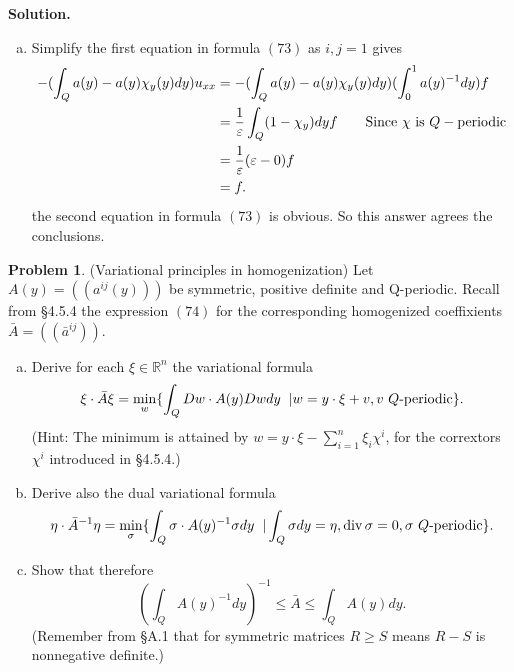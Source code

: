 \documentclass[a4paper]{book}
\newenvironment{solution}%
{\noindent\textbf{Solution.}}%
{\qedhere}
\numberwithin{equation}{chapter}
\theoremstyle{definition}
\newtheorem{pro}[exm]{Problem}
\begin{document}
\begin{solution}
  \begin{enumerate}[(b)]
  \item Simplify the first equation in formula $(73)$ as $i,j = 1$ gives
    \begin{align*}
      -(\int_Q a(y) - a(y) \chi_y(y) dy) u_{xx} &= - (\int_Q a(y) - a(y) \chi_y(y) dy) (\int_0^1 a(y)^{-1}dy) f \\
                                                &= \frac{1}{\varepsilon}\int_Q(1 - \chi_y) dy f \qquad \textmd{Since } \chi \textmd{ is } Q-\textmd{periodic} \\
      &= \frac{1}{\varepsilon} (\varepsilon - 0) f \\
      &= f.
    \end{align*}
    the second equation in formula $(73)$ is obvious. So this answer agrees the conclusions.
  \end{enumerate}
\end{solution}

\begin{pro}
  (Variational principles in homogenization) Let $A(y) = ((a^{ij}(y)))$ be symmetric, positive definite and Q-periodic. Recall from \S4.5.4 the expression $(74)$ for the corresponding homogenized coeffixients $\bar{A} = ((\bar{a}^{ij}))$.
  \begin{enumerate}[(a)]
  \item Derive for each $\xi \in \mathbb{R}^n$ the variational formula
    \[\xi \cdot \bar{A} \xi = \min\limits_w \{ \int_Q Dw \cdot A(y) Dw dy \left. \right.| w = y\cdot \xi + v, v\ Q\textmd{-periodic}\}.\]
    (Hint: The minimum is attained by $w = y \cdot \xi - \sum_{i = 1}^n \xi_i \chi^i$, for the corrextors $\chi^i$ introduced in \S4.5.4.)

  \item Derive also the dual variational formula
    \[\eta \cdot \bar{A}^{-1} \eta = \min\limits_{\sigma}\{\int _{Q} \sigma \cdot A(y)^{-1} \sigma dy \left. \right.| \int_{Q}\sigma dy = \eta, \operatorname{div}\sigma = 0, \sigma \ Q \textmd{-periodic}\}.\]
    
  \item Show that therefore
    \[\left( \int_Q A(y)^{-1} dy \right)^{-1} \leq \bar{A} \leq \int_Q A(y)dy.\]
    (Remember from \S A.1 that for symmetric matrices $R \geq S$ means $R - S$ is nonnegative definite.)
  \end{enumerate}
\end{pro}
\end{document}

